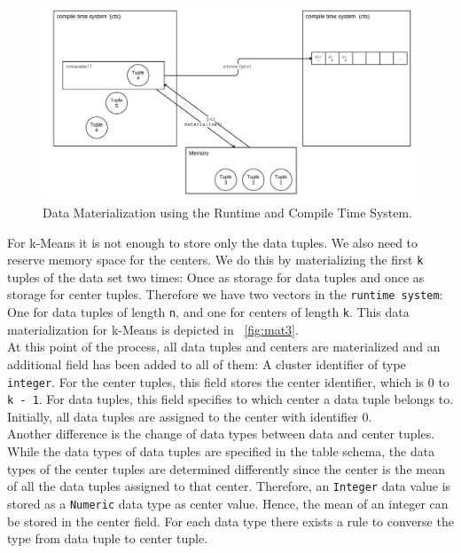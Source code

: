 \begin{figure}[htsb]
  \centering
  \includegraphics[scale=0.03]{figures/mat2_font}
  \caption[Data Materialization using the Runtime and Compile Time System]{Data Materialization using the Runtime and Compile Time System.}
  \label{fig:mat2}
\end{figure}

For k-Means it is not enough to store only the data tuples. We also need to reserve memory space for the centers. We do this by materializing the first \texttt{k} tuples of the data set two times: Once as storage for data tuples and once as storage for center tuples. Therefore we have two vectors in the \texttt{runtime system}: One for data tuples of length \texttt{n}, and one for centers of length \texttt{k}. This data materialization for k-Means is depicted in ~\autoref{fig:mat3}.
\\ 
At this point of the process, all data tuples and centers are materialized and an additional field has been added to all of them: A cluster identifier of type \texttt{integer}. For the center tuples, this field stores the center identifier, which is 0 to \texttt{k - 1}. For data tuples, this field specifies to which center a data tuple belongs to. Initially, all data tuples are assigned to the center with identifier 0. 
\\
Another difference is the change of data types between data and center tuples. While the data types of data tuples are specified in the table schema, the data types of the center tuples are determined differently since the center is the mean of all the data tuples assigned to that center. Therefore, an \texttt{Integer} data value is stored as a \texttt{Numeric} data type as center value. Hence, the mean of an integer can be stored in the center field. For each data type there exists a rule to converse the type from data tuple to center tuple.



